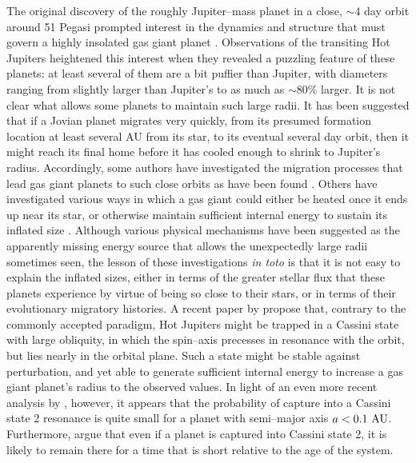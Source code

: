 \documentclass[12pt,preprint]{aastex}
\begin{document}
The original discovery of the roughly Jupiter--mass planet in a
close, $\sim 4$ day orbit around 51 Pegasi \citep{mayor+queloz1995} prompted
interest in the dynamics and structure that must govern a highly insolated
gas giant planet \citep{guillot_et_al1996}.  Observations of the transiting
Hot Jupiters heightened this interest when they revealed a puzzling feature of
these planets: at least several of them are a bit puffier than Jupiter, with
diameters ranging from slightly larger than Jupiter's to as much as $\sim 80\%$
larger.  It is not clear what allows some planets to maintain such large radii.
It has been suggested that if a
Jovian planet migrates very quickly, from its presumed formation location at
least several AU from its star, to its eventual several day orbit, then it
might reach its final home before it has cooled enough to shrink to Jupiter's
radius.  Accordingly, some authors have investigated the migration processes
that lead gas giant planets to such close orbits as have been found 
\citep[e.g.][]{trilling_et_al2002}.  Others have investigated various ways
in which a gas giant could either be heated once it ends up near its star, or
otherwise maintain sufficient internal energy to sustain its inflated size
\citep{guillot+showman2002, burrows_et_al2003, laughlin_et_al2005,
bodenheimer_et_al2003, guillot2005, burrows_et_al2007, chabrier+baraffe2007}.
Although various physical mechanisms have been suggested as the apparently
missing energy source that allows the unexpectedly large radii sometimes seen,
the lesson of these investigations {\it in toto} is that it is not easy to
explain the inflated sizes, either in terms of the greater stellar flux that
these planets experience by virtue of being so close to their stars, or in
terms of their evolutionary migratory histories.  A recent paper by
\citet{winn+holman2005} propose that, contrary to
the commonly accepted paradigm, Hot Jupiters might be trapped in a
Cassini state with large obliquity, in which the spin--axis precesses in
resonance with the orbit, but lies nearly in the orbital plane.  Such a state
might be stable against perturbation, and yet able to generate sufficient
internal energy to increase a gas giant planet's radius to the observed
values.  In light of an even more recent analysis by
\citet{levrard_et_al2007}, however, it appears that the probability of
capture into a Cassini state 2 resonance is quite small for a planet with
semi--major axis $a < 0.1 {\rm ~AU}$.  Furthermore, \citet{fabrycky_et_al2007}
argue that even if a planet is captured into Cassini state 2, it is likely to
remain there for a time that is short relative to the age of the system.
\end{document}
